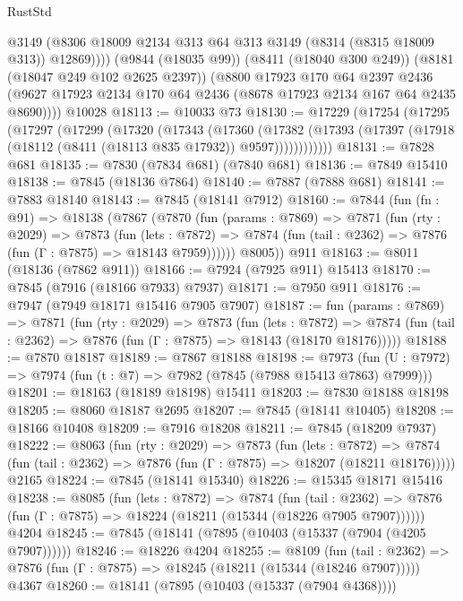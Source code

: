 \begin{lexlean}{RustStd}
\begin{coremodule}
            @3149
            (@8306 @18009 @2134 @313 @64 @313 @3149 (@8314 (@8315 @18009 @313)) @12869))))
      (@9844 (@18035 @99))
      (@8411 (@18040 @300 @249))
      (@8181 (@18047 @249 @102 @2625 @2397))
      (@8800
        @17923
        @170
        @64
        @2397
        @2436
        (@9627 @17923 @2134 @170 @64 @2436 (@8678 @17923 @2134 @167 @64 @2435 @8690))))
    @10028
@18113 := @10033 @73
@18130 := @17229
    (@17254
      (@17295
        (@17297
          (@17299
            (@17320
              (@17343
                (@17360
                  (@17382
                    (@17393 (@17397 (@17918 (@18112 (@8411 (@18113 @835 @17932)) @9597))))))))))))
@18131 := @7828 @681
@18135 := @7830 (@7834 @681) (@7840 @681)
@18136 := @7849 @15410
@18138 := @7845 (@18136 @7864)
@18140 := @7887 (@7888 @681)
@18141 := @7883 @18140
@18143 := @7845 (@18141 @7912)
@18160 := @7844
    (fun (fn : @91) =>
    @18138
      (@7867
        (@7870
          (fun (params : @7869) =>
          @7871
            (fun (rty : @2029) =>
            @7873
              (fun (lets : @7872) =>
              @7874 (fun (tail : @2362) => @7876 (fun (Γ : @7875) => @18143 @7959))))))
        @8005))
    @911
@18163 := @8011 (@18136 (@7862 @911))
@18166 := @7924 (@7925 @911) @15413
@18170 := @7845 (@7916 (@18166 @7933) @7937)
@18171 := @7950 @911
@18176 := @7947 (@7949 @18171 @15416 @7905 @7907)
@18187 := fun (params : @7869) =>
  @7871
    (fun (rty : @2029) =>
    @7873
      (fun (lets : @7872) =>
      @7874 (fun (tail : @2362) => @7876 (fun (Γ : @7875) => @18143 (@18170 @18176)))))
@18188 := @7870 @18187
@18189 := @7867 @18188
@18198 := @7973
    (fun (U : @7972) => @7974 (fun (t : @7) => @7982 (@7845 (@7988 @15413 @7863) @7999)))
@18201 := @18163 (@18189 @18198) @15411
@18203 := @7830 @18188 @18198
@18205 := @8060 @18187 @2695
@18207 := @7845 (@18141 @10405)
@18208 := @18166 @10408
@18209 := @7916 @18208
@18211 := @7845 (@18209 @7937)
@18222 := @8063
    (fun (rty : @2029) =>
    @7873
      (fun (lets : @7872) =>
      @7874 (fun (tail : @2362) => @7876 (fun (Γ : @7875) => @18207 (@18211 @18176)))))
    @2165
@18224 := @7845 (@18141 @15340)
@18226 := @15345 @18171 @15416
@18238 := @8085
    (fun (lets : @7872) =>
    @7874
      (fun (tail : @2362) =>
      @7876 (fun (Γ : @7875) => @18224 (@18211 (@15344 (@18226 @7905 @7907))))))
    @4204
@18245 := @7845 (@18141 (@7895 (@10403 (@15337 (@7904 (@4205 @7907))))))
@18246 := @18226 @4204
@18255 := @8109
    (fun (tail : @2362) => @7876 (fun (Γ : @7875) => @18245 (@18211 (@15344 (@18246 @7907)))))
    @4367
@18260 := @18141 (@7895 (@10403 (@15337 (@7904 @4368))))

\end{coremodule}
\end{lexlean}
